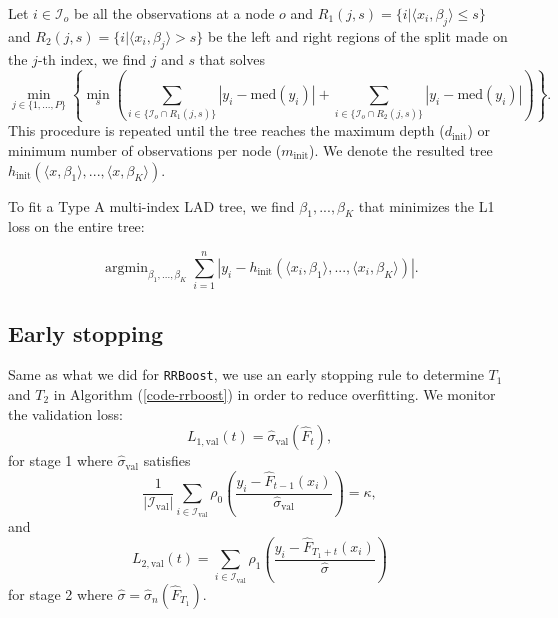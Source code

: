 \documentclass{article}
\let\oldref\ref
\renewcommand{\ref}[1]{(\oldref{#1})}
\DeclareMathOperator*{\argmin}{argmin}
\begin{document}
Let $i \in \mathcal{I}_o$ be all the observations at a node $o$ and $R_1(j,s) = \{i| \langle x_i, \beta_j \rangle \leq s\}$ and $R_2(j,s) = \{i| \langle x_i, \beta_j \rangle > s\}$  be the left and right regions of the split made on the $j$-th index, we find $j$ and $s$ that solves
$$\min_{j\in \{1,...,P\}} \left \{\min_{s} \left(\sum_{i \in \{\mathcal{I}_o \cap R_1(j, s)\}} |y_i - \text{med}(y_i)| + \sum_{i \in \{\mathcal{I}_o \cap R_2(j, s)\}}|y_i - \text{med}(y_i)| \right) \right \}. $$
This procedure is repeated until the tree reaches the maximum depth ($d_{\text{init}}$) or minimum number of observations per node ($m_{\text{init}}$).  We denote the resulted tree $h_{\text{init}}(\langle x,\beta_1 \rangle, ...,\langle x,\beta_K \rangle )$. 


To fit a  Type A multi-index  LAD tree, we find $\beta_1,..., \beta_K$ that minimizes the L1 loss on the entire tree: 

$$\argmin_{\beta_1,..., \beta_K} \sum_{i=1}^n|y_i - h_{\text{init}}(\langle x_i,\beta_1 \rangle, ...,\langle x_i,\beta_K \rangle)|.$$






\subsection{Early stopping}
Same as what we did for \texttt{RRBoost}, we use an early stopping rule to determine $T_1$ and $T_2$ in Algorithm \ref{code-rrboost} in order to reduce overfitting. We monitor the validation loss: 
$$L_{1,\text{val}}(t) = \hat{\sigma}_{\text{val}}(\hat{F}_t),$$
for stage 1 where $\hat{\sigma}_{\text{val}}$ satisfies 
 $$\frac{1}{| \mathcal{I}_{\text{val}}|}\sum_{i \in \mathcal{I}_{\text{val}}} \rho_0 \left( \frac{y_i - \hat{F}_{t-1}(x_i)}{\hat{\sigma}_{\text{val}}}\right) = \kappa,$$
 and
$$L_{2,\text{val}}(t) = \sum_{i\in \mathcal{I}_{\text{val}}} \rho_1 \left( \frac{y_i  - \hat{F}_{T_1 + t}(x_i)}{\hat{\sigma}}\right)$$
for stage 2 where 
$\hat{\sigma} =  \hat{\sigma}_n(\hat{F}_{T_1})$. 
\end{document}
